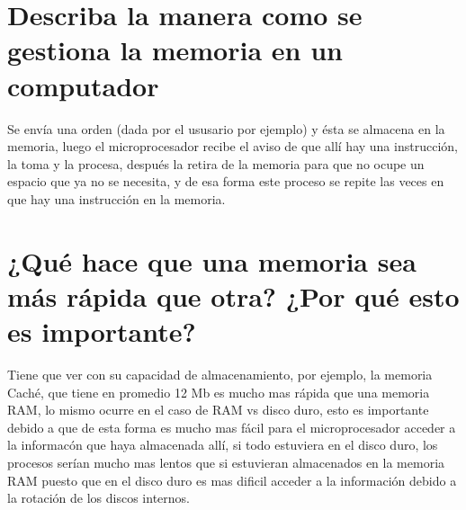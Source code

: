 \documentclass{article}
\begin{document}
\section{Describa la manera como se gestiona la memoria en un computador}
Se envía una orden (dada por el ususario por ejemplo) y ésta se almacena en la memoria, luego el microprocesador recibe el aviso de que allí hay una instrucción, la toma y la procesa, después la retira de la memoria para que no ocupe un espacio que ya no se necesita, y de esa forma este proceso se repite las veces en que hay una instrucción en la memoria.
\cite{memoria}
\section{¿Qué hace que una memoria sea más rápida que otra? ¿Por qué esto es importante?}
Tiene que ver con su capacidad de almacenamiento, por ejemplo, la memoria Caché, que tiene en promedio 12 Mb es mucho mas rápida que una memoria RAM, lo mismo ocurre en el caso de RAM vs disco duro, esto es importante debido a que de esta forma es mucho mas fácil para el microprocesador acceder a la informacón que haya almacenada allí, si todo estuviera en el disco duro, los procesos serían mucho mas lentos que si estuvieran almacenados en la memoria RAM puesto que en el disco duro es mas dificil acceder a la información debido a la rotación de los discos internos.
\cite{memoria}



\end{document}
